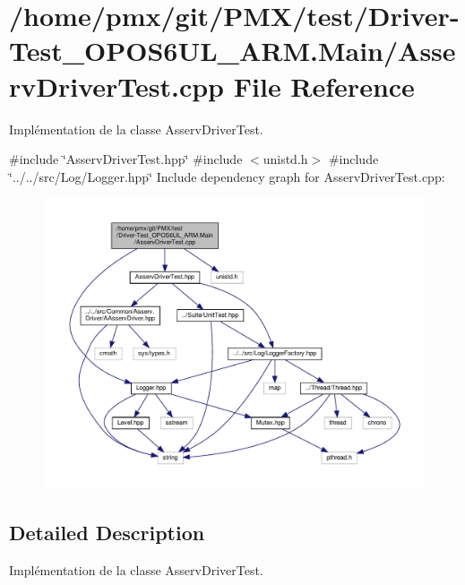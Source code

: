 \hypertarget{Driver-Test__OPOS6UL__ARM_8Main_2AsservDriverTest_8cpp}{}\section{/home/pmx/git/\+P\+M\+X/test/\+Driver-\/\+Test\+\_\+\+O\+P\+O\+S6\+U\+L\+\_\+\+A\+RM.Main/\+Asserv\+Driver\+Test.cpp File Reference}
\label{Driver-Test__OPOS6UL__ARM_8Main_2AsservDriverTest_8cpp}


Implémentation de la classe Asserv\+Driver\+Test.  


{\ttfamily \#include \char`\"{}Asserv\+Driver\+Test.\+hpp\char`\"{}}\newline
{\ttfamily \#include $<$unistd.\+h$>$}\newline
{\ttfamily \#include \char`\"{}../../src/\+Log/\+Logger.\+hpp\char`\"{}}\newline
Include dependency graph for Asserv\+Driver\+Test.\+cpp\+:
\nopagebreak
\begin{figure}[H]
\begin{center}
\leavevmode
\includegraphics[width=350pt]{Driver-Test__OPOS6UL__ARM_8Main_2AsservDriverTest_8cpp__incl}
\end{center}
\end{figure}


\subsection{Detailed Description}
Implémentation de la classe Asserv\+Driver\+Test. 

